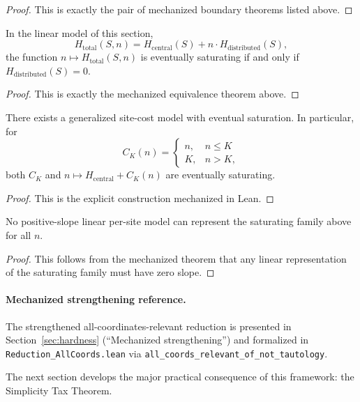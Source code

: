 \begin{proof}
This is exactly the pair of mechanized boundary theorems listed above.
\end{proof}

\begin{theorem}\label{thm:linear-saturation-iff-zero}
In the linear model of this section,
\[
H_{\text{total}}(S,n)=H_{\text{central}}(S)+n\cdot H_{\text{distributed}}(S),
\]
the function $n\mapsto H_{\text{total}}(S,n)$ is eventually saturating if and only if $H_{\text{distributed}}(S)=0$.
\end{theorem}

\begin{proof}
This is exactly the mechanized equivalence theorem above.
\end{proof}

\begin{theorem}\label{thm:generalized-saturation-possible}
There exists a generalized site-cost model with eventual saturation. In particular, for
\[
C_K(n)=\begin{cases}
n, & n\le K\\
K, & n>K,
\end{cases}
\]
both $C_K$ and $n\mapsto H_{\text{central}}+C_K(n)$ are eventually saturating.
\end{theorem}

\begin{proof}
This is the explicit construction mechanized in Lean.
\end{proof}

\begin{corollary}\label{cor:linear-positive-no-saturation}
No positive-slope linear per-site model can represent the saturating family above for all $n$.
\end{corollary}

\begin{proof}
This follows from the mechanized theorem that any linear representation of the saturating family must have zero slope.
\end{proof}

\paragraph{Mechanized strengthening reference.}
The strengthened all-coordinates-relevant reduction is presented in Section~\ref{sec:hardness} (``Mechanized strengthening'') and formalized in \texttt{Reduction\_AllCoords.lean} via \texttt{all\_coords\_relevant\_of\_not\_tautology}.

The next section develops the major practical consequence of this framework: the Simplicity Tax Theorem.
